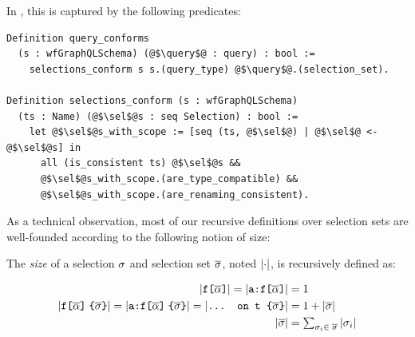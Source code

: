\noindent In \gcoql, this is captured by the following predicates:
\begin{verbatim}
Definition query_conforms 
  (s : wfGraphQLSchema) (@$\query$@ : query) : bool :=
    selections_conform s s.(query_type) @$\query$@.(selection_set).
  
Definition selections_conform (s : wfGraphQLSchema)
  (ts : Name) (@$\sel$@s : seq Selection) : bool :=
    let @$\sel$@s_with_scope := [seq (ts, @$\sel$@) | @$\sel$@ <- @$\sel$@s] in 
      all (is_consistent ts) @$\sel$@s &&
      @$\sel$@s_with_scope.(are_type_compatible) &&
      @$\sel$@s_with_scope.(are_renaming_consistent).
\end{verbatim}

As a technical observation, most of our recursive definitions over
selection sets are well-founded according to the following notion of
size:
\begin{definition}[\cite{gqlph}]
The \emph{size} of a selection $\sigma$ and selection set $\overline{\sigma}$, noted $\lvert \cdot \rvert$, is recursively defined as:
\begin{small}
\begin{align*}
    \lvert \texttt{f[}\overline{\alpha}\texttt{]} \rvert  = \lvert \texttt{a:}\texttt{f[}\overline{\alpha}\texttt{]} \rvert &=  1\\
    \lvert \texttt{f[}\overline{\alpha}\texttt{]}\; \texttt{\{}\overline{\sigma}\texttt{\}} \rvert = \lvert \texttt{a:}\texttt{f[}\overline{\alpha}\texttt{]}\; \texttt{\{}\overline{\sigma}\texttt{\}} \rvert = \lvert \texttt{... on t \{}\overline{\sigma}\texttt{\}} \rvert &= 1 + \lvert \overline{\sigma} \rvert\\
    \lvert \overline{\sigma} \rvert &= \textstyle\sum_{\sigma_{i} \in\; \overline{\sigma}}{\lvert \sigma_{i} \rvert}
    \end{align*}
\end{small}
\end{definition} 




